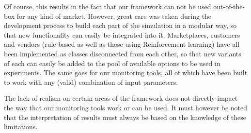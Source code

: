 Of course, this results in the fact that our framework can not be used out-of-the-box for any kind of market. However, great care was taken during the development process to build each part of the simulation in a modular way, so that new functionality can easily be integrated into it. Marketplaces, customers and vendors (rule-based as well as those using Reinforcement learning) have all been implemented as classes disconnected from each other, so that new variants of each can easily be added to the pool of available options to be used in experiments. The same goes for our monitoring tools, all of which have been built to work with any (valid) combination of input parameters.

The lack of realism on certain areas of the framework does not directly impact the way that our monitoring tools work or can be used. It must however be noted that the interpretation of results must always be based on the knowledge of these limitations.